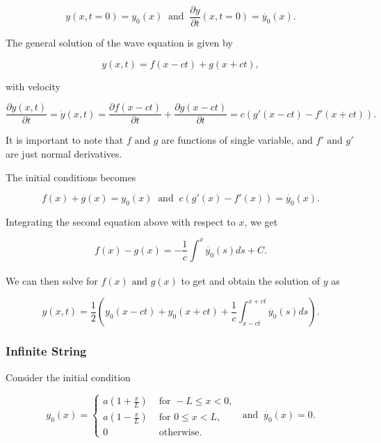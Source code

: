 \documentclass[a4paper,12pt]{report}
\begin{document}
\begin{equation}
	y(x,t=0) = y_0 (x) ~\text { and }~ \frac{\partial y}{\partial t} (x,t=0) = \dot{y_0 }(x). 
\end{equation}

The general solution of the wave equation is given by

\begin{equation}
	y(x,t) = f(x-ct) + g(x+ct),
\end{equation}

with velocity

\begin{equation}
	\frac{\partial y(x,t)}{\partial t} = \dot{y}(x,t) = \frac{\partial f(x-ct)}{\partial t} + \frac{\partial g(x-ct)}{\partial t} = c(g'(x-ct) - f'(x+ct)).
\end{equation}

It is important to note that \(f \text { and } g\) are functions of single variable, and \(f' \text { and } g'\) are just normal derivatives. 

The initial conditions becomes 

\begin{equation}
	f(x)+g(x) = y_0 (x) ~\text { and }~ c\left(g'(x) - f'(x)\right) = \dot{y_0 }(x).
\end{equation}

Integrating the second equation above with respect to \(x\), we get 

\begin{equation}
	f(x) - g(x) = - \frac{1}{c}\int_{}^{x} \dot{y_0 }(s)ds + C.
\end{equation}

We can then solve for \(f(x) \text { and } g(x)\) to get and obtain the solution of \(y\) as 

\begin{equation}
	y(x,t) = \frac{1}{2}\left( y_0 (x-ct) + y_0 (x+ct) + \frac{1}{c} \int_{x-ct}^{x+ct} \dot{y_0 }(s)ds    \right).
\end{equation}

\subsubsection{Infinite String}

Consider the initial condition 

\begin{equation}
	y_0 (x) = \begin{cases} a\left(1+\frac{x}{L} \right) &\text{ for } -L \le x < 0, \\ a\left(1-\frac{x}{L} \right) &\text{ for } 0 \le x < L, \\ 0 &\text{ otherwise}. \end{cases} ~\text { and }~ \dot{y_0} (x) = 0.   
\end{equation}
\end{document}
